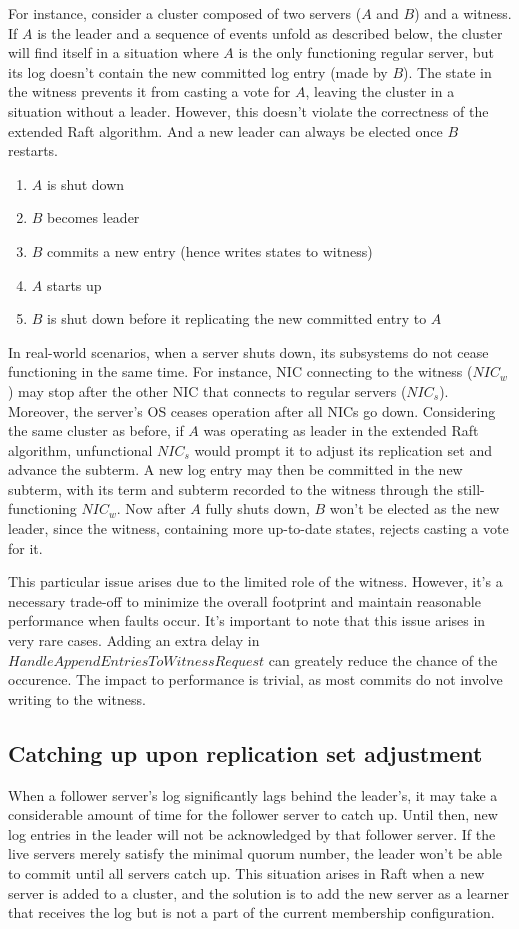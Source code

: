 For instance, consider a cluster composed of two servers ($A$ and $B$) and a witness. If $A$ is the leader and a sequence of events unfold as described below, the cluster will find itself in a situation where $A$ is the only functioning regular server, but its log doesn't contain the new committed log entry (made by $B$). The state in the witness prevents it from casting a vote for $A$, leaving the cluster in a situation without a leader. However, this doesn't violate the correctness of the extended Raft algorithm. And a new leader can always be elected once $B$ restarts.
\begin{enumerate}
    \item $A$ is shut down
    \item $B$ becomes leader
    \item $B$ commits a new entry (hence writes states to witness)
    \item $A$ starts up
    \item $B$ is shut down before it replicating the new committed entry to $A$
\end{enumerate}

In real-world scenarios, when a server shuts down, its subsystems do not cease functioning in the same time. For instance, NIC connecting to the witness ($NIC_w$) may stop after the other NIC that connects to regular servers ($NIC_s$). Moreover, the server's OS ceases operation after all NICs go down. Considering the same cluster as before, if $A$ was operating as leader in the extended Raft algorithm, unfunctional $NIC_s$ would prompt it to adjust its replication set and advance the subterm. A new log entry may then be committed in the new subterm, with its term and subterm recorded to the witness through the still-functioning $NIC_w$. Now after $A$ fully shuts down, $B$ won't be elected as the new leader, since the witness, containing more up-to-date states, rejects casting a vote for it.

This particular issue arises due to the limited role of the witness. However, it's a necessary trade-off to minimize the overall footprint and maintain reasonable performance when faults occur. It's important to note that this issue arises in very rare cases. Adding an extra delay in $HandleAppendEntriesToWitnessRequest$ can greately reduce the chance of the occurence. The impact to performance is trivial, as most commits do not involve writing to the witness.

\subsection{Catching up upon replication set adjustment}
When a follower server's log significantly lags behind the leader's, it may take a considerable amount of time for the follower server to catch up. Until then, new log entries in the leader will not be acknowledged by that follower server. If the live servers merely satisfy the minimal quorum number, the leader won't be able to commit until all servers catch up. This situation arises in Raft when a new server is added to a cluster, and the solution is to add the new server as a learner that receives the log but is not a part of the current membership configuration.

